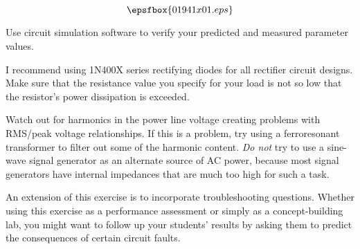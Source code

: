 

$$\epsfbox{01941x01.eps}$$

\vfil \eject






Use circuit simulation software to verify your predicted and measured parameter values.







I recommend using 1N400X series rectifying diodes for all rectifier circuit designs.  Make sure that the resistance value you specify for your load is not so low that the resistor's power dissipation is exceeded.  

Watch out for harmonics in the power line voltage creating problems with RMS/peak voltage relationships.  If this is a problem, try using a ferroresonant transformer to filter out some of the harmonic content.  {\it Do not} try to use a sine-wave signal generator as an alternate source of AC power, because most signal generators have internal impedances that are much too high for such a task.

An extension of this exercise is to incorporate troubleshooting questions.  Whether using this exercise as a performance assessment or simply as a concept-building lab, you might want to follow up your students' results by asking them to predict the consequences of certain circuit faults.




